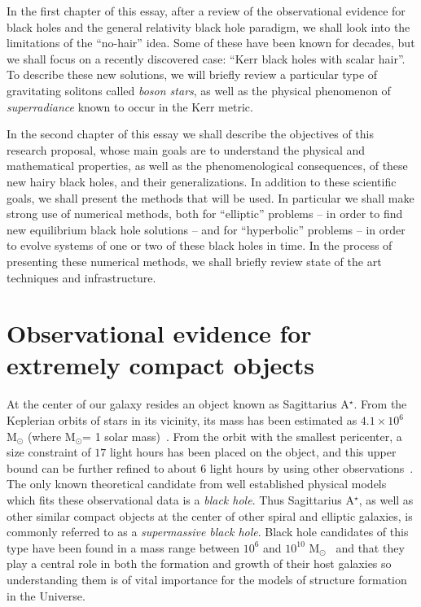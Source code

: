In the first chapter of this essay, after a review of the observational evidence for black holes and the general relativity black hole paradigm, we shall look into the limitations of the ``no-hair'' idea.
Some of these have been known for decades, but we shall focus on a recently discovered case: ``Kerr black holes with scalar hair''.
To describe these new solutions,  we will briefly review a particular type of gravitating solitons called \textit{boson stars}, as well as the physical phenomenon of \textit{superradiance} known to occur in the Kerr metric.
   
In the second chapter of this essay we shall describe the objectives of this research proposal, whose main goals are to understand the physical and mathematical properties, as well as the phenomenological consequences, of these new hairy black holes, and their generalizations.
In addition to these scientific goals, we shall present the methods that will be used.
In particular we shall make strong use of numerical methods, both for ``elliptic'' problems -- in order to find new equilibrium black hole solutions -- and for ``hyperbolic'' problems -- in order to evolve systems of one or two of these black holes in time.
In the process of presenting these numerical methods, we shall briefly review state of the art techniques and infrastructure. 
\section{Observational evidence for extremely compact objects}

At the center of our galaxy resides an object known as Sagittarius A$^\star$.
From the Keplerian orbits of stars in its vicinity, its mass has been estimated as $4.1\times 10^6$ M$_\odot$ (where M$_\odot$= 1 solar mass)~\cite{Ghez:2008ms}.
From the orbit with the smallest pericenter, a size constraint of $17$ light hours has been placed on the object, and this upper bound can be further refined to about $6$ light hours by using other observations~\cite{Ghez:2003qj}.
The only known theoretical candidate from well established physical models which fits these observational data is a \textit{black hole}.
Thus Sagittarius A$^\star$, as well as other similar compact objects at the center of other spiral and elliptic galaxies, is commonly referred to as a \emph{supermassive black hole}.
Black hole candidates of this type have been found in a mass range between $10^6$ and $10^{10}$ M$_\odot$~\cite{Narayan:2013gca} and that they play a central role in both the formation and growth of their host galaxies \cite{Kormendy:2013pja} so understanding them is of vital importance for the models of structure formation in the Universe.

